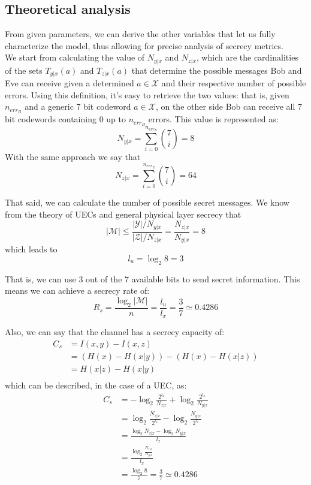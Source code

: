 \documentclass[a4paper,12pt,titlepage]{article}
\begin{document}
\subsection*{Theoretical analysis}
From given parameters, we can derive the other variables that let us fully characterize
the model, thus allowing for precise analysis of secrecy metrics. \\
We start from calculating the value of $N_{y|x}$ and $N_{z|x}$, which are the
cardinalities of the sets $T_{y|x}(a)$ and $T_{z|x}(a)$ that determine the
possible messages Bob and Eve can receive given a determined $a \in
\mathcal{X}$ and their respective number of possible errors. Using this
definition, it's easy to retrieve the two values: that is, given $n_{err_B}$
and a generic 7 bit codeword $a \in \mathcal{X}$, on the other
side Bob can receive all 7 bit codewords containing $0$ up to $n_{err_B}$
errors. This value is represented as:
\[N_{y|x} = \sum_{i = 0}^{n_{err_B}} {7 \choose i} = 8\]
With the same approach we say that
\[N_{z|x} = \sum_{i = 0}^{n_{err_E}} {7 \choose i} = 64\]

That said, we can calculate the number of possible secret messages. We know
from the theory of UECs and general physical layer secrecy that
\[\left|\mathcal{M}\right| \leq
\frac{\left|\mathcal{Y}\right| / N_{y|x}}{\left|\mathcal{Z}\right| / N_{z|x}}
= \frac{N_{z|x}}{N_{y|x}} = 8\]
which leads to
\[l_u = \log_2 8 = 3\]

That is, we can use $3$ out of the $7$ available bits to send secret
information. This means we can achieve a secrecy rate of:
\[ R_s = \frac{\log_2 |\mathcal{M}|}{n} = \frac{l_u}{l_x} = \frac{3}{7} \simeq 0.4286 \]

Also, we can say that the channel has a secrecy capacity of:
\begin{align*}
C_s &= I(x, y) - I(x, z) \\
    &= (H(x) - H(x|y)) - (H(x) - H(x|z)) \\
    &= H(x|z) - H(x|y) \\
\end{align*}
which can be described, in the case of a UEC, as:
\begin{align*}
C_s &= - \log_2 \frac{2^{l_x}}{N_{z|x}} + \log_2 \frac{2^{l_x}}{N_{y|x}} \\
    &= \log_2 \frac{N_{z|x}}{2^{l_x}} - \log_2 \frac{N_{y|x}}{2^{l_x}} \\
    &= \frac{\log_2 N_{z|x} - \log_2 N_{y|x}}{l_x} \\
    &= \frac{\log_2 {\frac{N_{z|x}}{N_{y|x}}}}{l_x} \\
    &= \frac{\log_2 8}{7} = \frac{3}{7} \simeq 0.4286
\end{align*}
\end{document}

